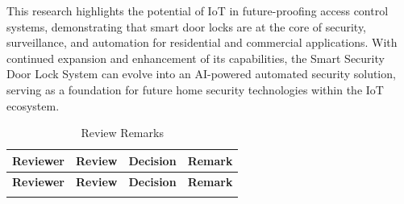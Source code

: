 \documentclass[a4paper]{scrartcl}
\begin{document}
This research highlights the potential of IoT in future-proofing access control systems, demonstrating that smart door locks are at the core of security, surveillance, and automation for residential and commercial applications. With continued expansion and enhancement of its capabilities, the Smart Security Door Lock System can evolve into an AI-powered automated security solution, serving as a foundation for future home security technologies within the IoT ecosystem.

	\printbibliography[title={References}]



\begin{longtable}{|l|p{4cm}|p{3cm}|p{4cm}|} %
    \caption{Review Remarks} %
    \label{tab:review_remarks} \\ %
    \hline
    \textbf{Reviewer} & \textbf{Review} & \textbf{Decision} & \textbf{Remark} \\ %
    \hline
    \endfirsthead %
    \hline
    \textbf{Reviewer} & \textbf{Review} & \textbf{Decision} & \textbf{Remark} \\ %
    \hline
    \endhead %
    \hline
    \endfoot %
    \hline
    \endlastfoot %


\end{longtable}
\end{document}
